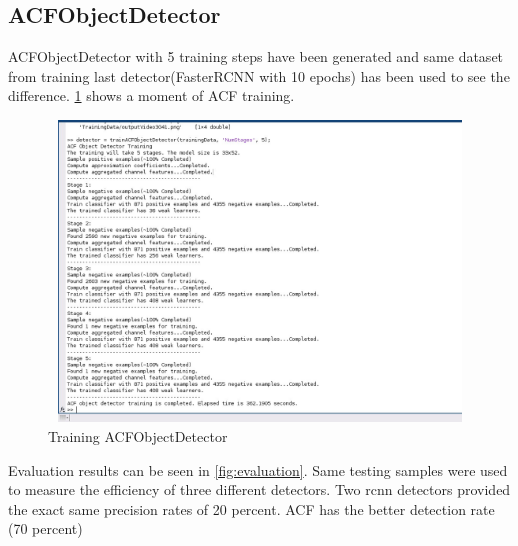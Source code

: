 \subsection{ACFObjectDetector}
ACFObjectDetector with 5 training steps have been generated and same dataset from training last detector(FasterRCNN with 10 epochs) has been used to see the difference. \ref{fig:acfTrainProcess} shows a moment of ACF training. 
\begin{figure}
    \centering
    \includegraphics[width=12cm, height=8cm]{images/TrainpocessACF.jpg}
    \caption{Training ACFObjectDetector}
    \label{fig:acfTrainProcess}
\end{figure}
Evaluation results can be seen in \ref{fig:evaluation}. Same testing samples were used to measure the efficiency of three different detectors. Two \acrshort{rcnn} detectors provided the exact same precision rates of 20 percent. ACF has the better detection rate (70 percent)
